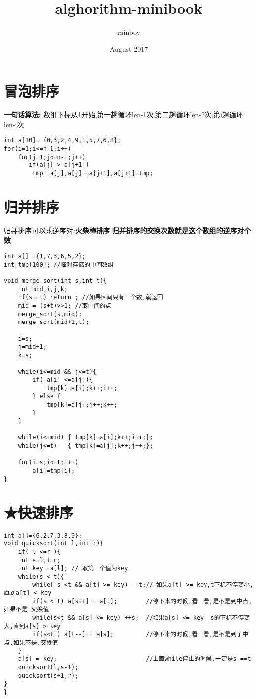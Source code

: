 \documentclass{article}
\title{alghorithm-minibook}
\author{rainboy }
\date{August 2017}
\begin{document}
{\setmainfont{FOT-MatissePro-EB.otf}
\maketitle
}
\newpage
\tableofcontents
\pagebreak


\section{冒泡排序}

\textbf{\underline{一句话算法:}} 数组下标从1开始,第一趟循环len-1次,第二趟循环len-2次,第i趟循环len-i次 

\begin{lstlisting}
int a[10]= {0,3,2,4,9,1,5,7,6,8};
for(i=1;i<=n-1;i++)
    for(j=1;j<=n-i;j++)
       if(a[j] > a[j+1])   
        tmp =a[j],a[j] =a[j+1],a[j+1]=tmp;
\end{lstlisting}

\section{归并排序}

归并排序可以求逆序对:\textbf{火柴棒排序}
\textbf{归并排序的交换次数就是这个数组的逆序对个数}

\begin{lstlisting}
int a[] ={1,7,3,6,5,2};
int tmp[100]; //临时存储的中间数组

void merge_sort(int s,int t){
    int mid,i,j,k;
    if(s==t) return ; //如果区间只有一个数,就返回
    mid = (s+t)>>1; //取中间的点
    merge_sort(s,mid);
    merge_sort(mid+1,t);

    i=s;
    j=mid+1;
    k=s;

    while(i<=mid && j<=t){
        if( a[i] <=a[j]){
            tmp[k]=a[i];k++;i++;
        } else {
            tmp[k]=a[j];j++;k++;
        }
    }

    while(i<=mid) { tmp[k]=a[i];k++;i++;};
    while(j<=t)   { tmp[k]=a[j];k++;j++;};

    for(i=s;i<=t;i++)
        a[i]=tmp[i];
}
\end{lstlisting}



\section{★快速排序}

\begin{lstlisting}
int a[]={6,2,7,3,8,9};
void quicksort(int l,int r){
    if( l <=r ){
    int s=l,t=r;
    int key =a[l]; // 取第一个值为key
    while(s < t){
        while( s <t && a[t] >= key) --t;// 如果a[t] >= key,t下标不停变小,直到a[t] < key
        if(s < t) a[s++] = a[t];        //停下来的时候,看一看,是不是到中点,如果不是 交换值
        while(s<t && a[s] <= key) ++s;  //如果a[s] <= key  s的下标不停变大,直到a[s] > key
        if(s<t ) a[t--] = a[s];         //停下来的时候,看一看,是不是到了中点,如果不是,交换值
    }
    a[s] = key;                         //上面while停止的时候,一定是s ==t
    quicksort(l,s-1);
    quicksort(s+1,r);
}
}
\end{lstlisting}
\end{document}
